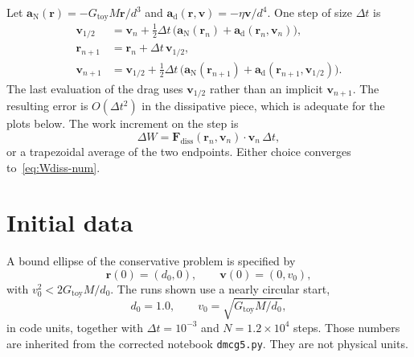 Let \(\mathbf{a}_{\mathrm{N}}(\mathbf{r})
=-G_{\mathrm{toy}}M\mathbf{r}/d^{3}\) and
\(\mathbf{a}_{\mathrm{d}}(\mathbf{r},\mathbf{v})
=-\eta\mathbf{v}/d^{4}\). One step of size \(\Delta t\) is
\begin{equation}
  \label{eq:verlet}
  \begin{aligned}
    \mathbf{v}_{1/2}
    &=\mathbf{v}_{n}
      +\tfrac12\Delta t\,
       \bigl(
         \mathbf{a}_{\mathrm{N}}(\mathbf{r}_{n})
         +\mathbf{a}_{\mathrm{d}}(\mathbf{r}_{n},\mathbf{v}_{n})
       \bigr),\\
    \mathbf{r}_{n+1}
    &=\mathbf{r}_{n}+\Delta t\,\mathbf{v}_{1/2},\\
    \mathbf{v}_{n+1}
    &=\mathbf{v}_{1/2}
      +\tfrac12\Delta t\,
       \bigl(
         \mathbf{a}_{\mathrm{N}}(\mathbf{r}_{n+1})
         +\mathbf{a}_{\mathrm{d}}(\mathbf{r}_{n+1},\mathbf{v}_{1/2})
       \bigr).
  \end{aligned}
\end{equation}
The last evaluation of the drag uses \(\mathbf{v}_{1/2}\) rather
than an implicit \(\mathbf{v}_{n+1}\). The resulting error is
\(O(\Delta t^{2})\) in the dissipative piece, which is adequate
for the plots below. The work increment on the step is
\begin{equation}
  \label{eq:dW}
  \Delta W
  =\mathbf{F}_{\mathrm{diss}}(\mathbf{r}_{n},\mathbf{v}_{n})
   \cdot\mathbf{v}_{n}\,\Delta t,
\end{equation}
or a trapezoidal average of the two endpoints. Either choice
converges to~\eqref{eq:Wdiss-num}.

\section{Initial data}
\label{sec:ch15-ic}

A bound ellipse of the conservative problem is specified by
\begin{equation}
  \label{eq:ic}
  \mathbf{r}(0)=(d_0,0),\qquad
  \mathbf{v}(0)=(0,v_0),
\end{equation}
with \(v_0^2<2G_{\mathrm{toy}}M/d_0\). The runs shown use a
nearly circular start,
\begin{equation}
  \label{eq:ic-num}
  d_0=1.0,\qquad
  v_0=\sqrt{G_{\mathrm{toy}}M/d_0},
\end{equation}
in code units, together with
\(\Delta t=10^{-3}\) and \(N=1.2\times 10^{4}\) steps. Those
numbers are inherited from the corrected notebook
\texttt{dmcg5.py}. They are not physical units.

